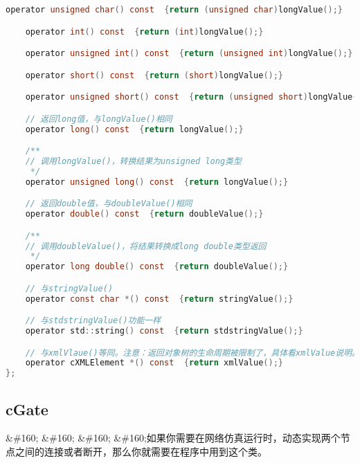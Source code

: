 \begin{lstlisting}[language=c]
    operator unsigned char() const  {return (unsigned char)longValue();}

    operator int() const  {return (int)longValue();}

    operator unsigned int() const  {return (unsigned int)longValue();}

    operator short() const  {return (short)longValue();}

    operator unsigned short() const  {return (unsigned short)longValue();}

    // 返回long值，与longValue()相同
    operator long() const  {return longValue();}

    /**
    // 调用longValue()，转换结果为unsigned long类型
     */
    operator unsigned long() const  {return longValue();}

    // 返回double值，与doubleValue()相同
    operator double() const  {return doubleValue();}

    /**
    // 调用doubleValue()，将结果转换成long double类型返回
     */
    operator long double() const  {return doubleValue();}

    // 与stringValue()
    operator const char *() const  {return stringValue();}

    // 与stdstringValue()功能一样
    operator std::string() const  {return stdstringValue();}

    // 与xmlVlaue()等同。注意：返回对象树的生命周期被限制了，具体看xmlValue说明。
    operator cXMLElement *() const  {return xmlValue();}
};
\end{lstlisting}

\subsection{cGate}
\label{cgate}

\&\#160; \&\#160; \&\#160; \&\#160;如果你需要在网络仿真运行时，动态实现两个节点之间的连接或者断开，那么你就需要在程序中用到这个类。

